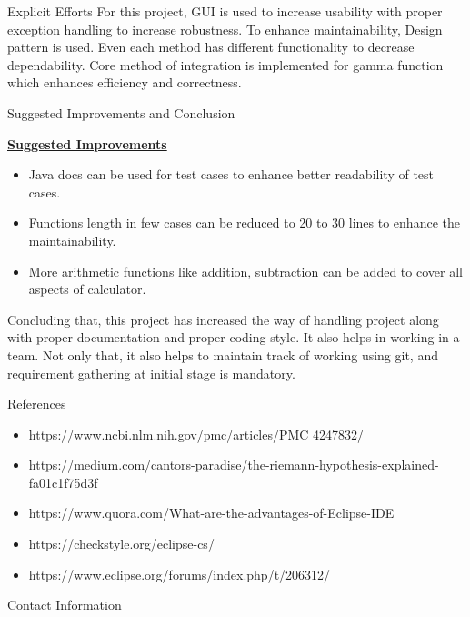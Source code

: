 \documentclass[final]{beamer}
\newlength{\onecolwid}
\begin{document}
\begin{frame}
\begin{columns}[t]
\begin{column}{\onecolwid}
\begin{exampleblock}{Explicit Efforts}
\small{For this project, GUI is used to increase usability with proper exception handling to increase robustness. To enhance maintainability, Design pattern is used. Even each method has different functionality to decrease dependability. Core method of integration is implemented for gamma function which enhances efficiency and correctness.}


\end{exampleblock}


\begin{exampleblock}{Suggested Improvements and Conclusion}
\small{
\textbf{\underline{Suggested Improvements}}
\begin{itemize}
\item Java docs can be used for test cases to enhance better readability of test cases.
\item Functions length in few cases can be reduced to 20 to 30 lines to enhance the maintainability.
\item More arithmetic functions like addition, subtraction can be added to cover all aspects of calculator.
\end{itemize}
Concluding that, this project has increased the way of handling project along with proper documentation and proper coding style. It also helps in working in a team. Not only that, it also helps to maintain track of working using git, and requirement gathering at initial stage is mandatory.}
\end{exampleblock}



\begin{exampleblock}{References}

\small{\begin{itemize}
\item  https://www.ncbi.nlm.nih.gov/pmc/articles/PMC 4247832/
\item https://medium.com/cantors-paradise/the-riemann-hypothesis-explained-fa01c1f75d3f
\item https://www.quora.com/What-are-the-advantages-of-Eclipse-IDE
\item https://checkstyle.org/eclipse-cs/
\item https://www.eclipse.org/forums/index.php/t/206312/
\end{itemize}}
\end{exampleblock}



\begin{block}{Contact Information}


\end{block}
\end{column}
\end{columns}
\end{frame}
\end{document}
